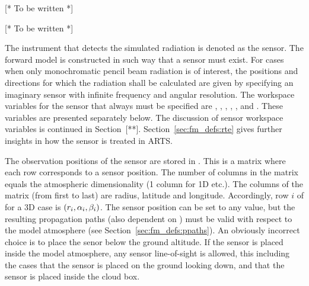 \label{sec:fm_defs:polarisation}

[* To be written *]



\label{sec:fm_defs:absorption}

[* To be written *]



\label{sec:fm_defs:sensor1}

The instrument that detects the simulated radiation is denoted as the
sensor. The forward model is constructed in such
way that a sensor must exist. For cases when only monochromatic pencil
beam radiation is of interest, the positions and directions for which
the radiation shall be calculated are given by specifying an imaginary
sensor with infinite frequency and angular resolution. The workspace
variables for the sensor that always must be specified are
, ,
, ,
,  and
. These variables are presented separately below. The
discussion of sensor workspace variables is continued in Section~[**].
Section~\ref{sec:fm_defs:rte} gives further insights in how the sensor
is treated in ARTS.


\label{sec:fm_defs:sensorpos}

The observation positions of the sensor are stored in
. This is a matrix where each row corresponds to
a sensor position. The number of columns in the matrix equals the
atmospheric dimensionality (1 column for 1D etc.). The columns of the
matrix (from first to last) are radius, latitude and longitude.
Accordingly, row $i$ of  for a 3D case is
$(r_{i},\alpha_{i},\beta_{i})$. The sensor position can be set to any
value, but the resulting propagation paths (also dependent on
) must be valid with respect to the model
atmosphere (see Section~\ref{sec:fm_defs:ppaths}). An obviously
incorrect choice is to place the senor below the ground altitude. If
the sensor is placed inside the model atmosphere, any sensor
line-of-sight is allowed, this including the cases that the sensor is
placed on the ground looking down, and that the sensor is placed
inside the cloud box.

